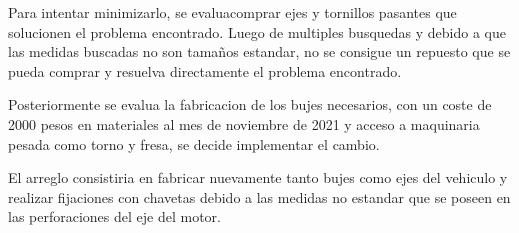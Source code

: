 \begin{itemize}
        Para intentar minimizarlo, se evaluacomprar ejes y tornillos pasantes que solucionen el problema encontrado. Luego de multiples busquedas y debido a que las medidas buscadas no son tamaños estandar, no se consigue un repuesto que se pueda comprar y resuelva directamente el problema encontrado.

        Posteriormente se evalua la fabricacion de los bujes necesarios, con un coste de 2000 pesos en materiales al mes de noviembre de 2021 y acceso a maquinaria pesada como torno y fresa, se decide implementar el cambio.

        El arreglo consistiria en fabricar nuevamente tanto bujes como ejes del vehiculo y realizar fijaciones con chavetas debido a las medidas no estandar que se poseen en las perforaciones del eje del motor.
        
    \end{itemize}

